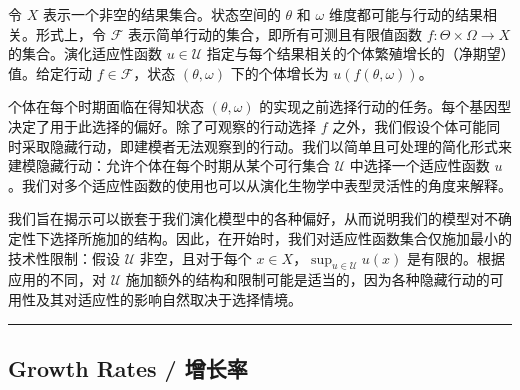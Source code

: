 \documentclass[12pt,a4paper]{article}
\newenvironment{translation}
  {\par\noindent\color{blue!70!black}\smallskip}
  {\par\medskip\hrule\medskip}
\begin{document}
\begin{translation}
令 $X$ 表示一个非空的结果集合。状态空间的 $\theta$ 和 $\omega$ 维度都可能与行动的结果相关。形式上，令 $\mathcal{F}$ 表示简单行动的集合，即所有可测且有限值函数 $f \colon \Theta \times \Omega \to X$ 的集合。演化适应性函数 $u \in \mathcal{U}$ 指定与每个结果相关的个体繁殖增长的（净期望）值。给定行动 $f \in \mathcal{F}$，状态 $(\theta, \omega)$ 下的个体增长为 $u(f(\theta, \omega))$。

个体在每个时期面临在得知状态 $(\theta, \omega)$ 的实现之前选择行动的任务。每个基因型决定了用于此选择的偏好。除了可观察的行动选择 $f$ 之外，我们假设个体可能同时采取隐藏行动，即建模者无法观察到的行动。我们以简单且可处理的简化形式来建模隐藏行动：允许个体在每个时期从某个可行集合 $\mathcal{U}$ 中选择一个适应性函数 $u$。我们对多个适应性函数的使用也可以从演化生物学中表型灵活性的角度来解释。

我们旨在揭示可以嵌套于我们演化模型中的各种偏好，从而说明我们的模型对不确定性下选择所施加的结构。因此，在开始时，我们对适应性函数集合仅施加最小的技术性限制：假设 $\mathcal{U}$ 非空，且对于每个 $x \in X$，$\sup_{u \in \mathcal{U}} u(x)$ 是有限的。根据应用的不同，对 $\mathcal{U}$ 施加额外的结构和限制可能是适当的，因为各种隐藏行动的可用性及其对适应性的影响自然取决于选择情境。
\end{translation}

\subsection{Growth Rates / 增长率}
\end{document}
